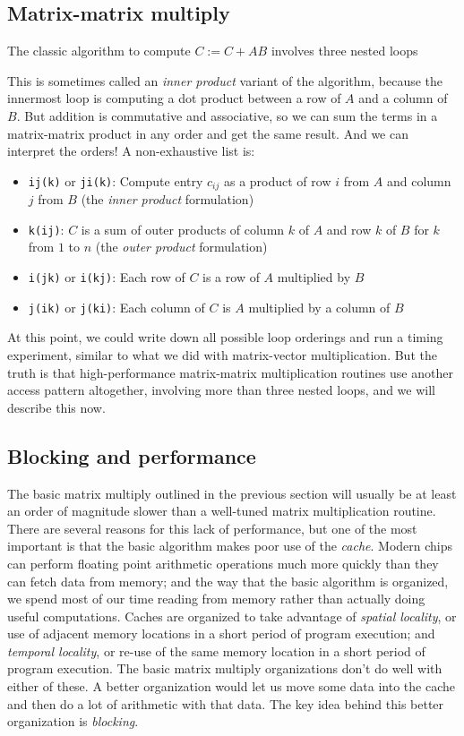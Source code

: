 \documentclass[12pt, leqno]{article} %
\begin{document}

\subsection{Matrix-matrix multiply}

The classic algorithm to compute $C := C + AB$ involves
three nested loops

This is sometimes called an {\em inner product} variant of
the algorithm, because the innermost loop is computing a dot
product between a row of $A$ and a column of $B$.  But
addition is commutative and associative, so we can sum the
terms in a matrix-matrix product in any order and get the same
result.  And we can interpret the orders!  A non-exhaustive
list is:
\begin{itemize}
\item {\tt ij(k)} or {\tt ji(k)}: Compute entry $c_{ij}$ as a
  product of row $i$ from $A$ and column $j$ from $B$
  (the {\em inner product} formulation)
\item {\tt k(ij)}: $C$ is a sum of outer products of column $k$
  of $A$ and row $k$ of $B$ for $k$ from $1$ to $n$
  (the {\em outer product} formulation)
\item {\tt i(jk)} or {\tt i(kj)}: Each row of $C$ is a row of
  $A$ multiplied by $B$
\item {\tt j(ik)} or {\tt j(ki)}: Each column of $C$ is $A$
  multiplied by a column of $B$
\end{itemize}
At this point, we could write down all possible loop orderings
and run a timing experiment, similar to what we did with
matrix-vector multiplication.  But the truth is that high-performance
matrix-matrix multiplication routines use another access pattern
altogether, involving more than three nested loops, and we will
describe this now.

\subsection{Blocking and performance}

The basic matrix multiply outlined in the previous section will
usually be at least an order of magnitude slower than a well-tuned
matrix multiplication routine.  There are several reasons for this
lack of performance, but one of the most important is that the basic
algorithm makes poor use of the {\em cache}.
Modern chips can perform floating point arithmetic operations much
more quickly than they can fetch data from memory; and the way that
the basic algorithm is organized, we spend most of our time reading
from memory rather than actually doing useful computations.
Caches are organized to take advantage of {\em spatial locality},
or use of adjacent memory locations in a short period of program execution;
and {\em temporal locality}, or re-use of the same memory location in a
short period of program execution.  The basic matrix multiply organizations
don't do well with either of these.
A better organization would let us move some data into the cache
and then do a lot of arithmetic with that data.  The key idea behind
this better organization is {\em blocking}.
\end{document}
